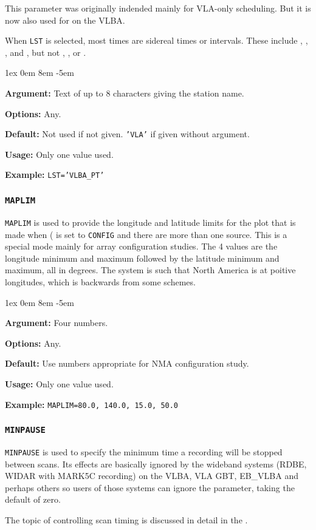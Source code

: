 \documentclass{report}
\newcommand{\rcwbox}[5]{
  \begin{list}{}{\parsep 1ex  \itemsep 0em
                 \leftmargin 8em  \itemindent -5em }
    \item {\bf Argument:} #1
    \item {\bf Options:}  #2
    \item {\bf Default:}  #3
    \item {\bf Usage:}    #4
    \item {\bf Example:}  #5
  \end{list}
}
\begin{document}
This parameter was originally indended mainly for VLA-only scheduling.
But it is now also used for 
on the VLBA.

When {\tt LST} is selected, most times are sidereal times or
intervals.  These include ,
, , and
, but not , , or
.

\rcwbox
{Text of up to 8 characters giving the station name.}
{Any.}
{Not used if not given. {\tt 'VLA'} if given without argument.}
{Only one value used.}
{{\tt LST='VLBA\_PT'}}

\subsubsection{\label{MP:MAPLIM}{\tt MAPLIM}}

{\tt MAPLIM} is used to provide the longitude and latitude limits for
the plot that is made when ( is
set to {\tt CONFIG} and there are more than one source.  This is
a special mode mainly for array configuration studies.  The 4
values are the longitude minimum and maximum followed by the
latitude minimum and maximum, all in degrees.  The system is such
that North America is at poitive longitudes, which is backwards from
some schemes.

\rcwbox
{Four numbers.}
{Any.}
{Use numbers appropriate for NMA configuration study.}
{Only one value used.}
{{\tt MAPLIM=80.0, 140.0, 15.0, 50.0}}


\subsubsection{\label{MP:MINPAUSE}{\tt MINPAUSE}}

{\tt MINPAUSE} is used to specify the minimum time a recording will be
stopped between scans.  Its effects are basically ignored by the 
wideband systems (RDBE, WIDAR with MARK5C recording) on the VLBA, VLA
GBT, EB\_VLBA and perhaps others so users of those systems can ignore
the parameter, taking the default of zero.

The topic of controlling scan timing is discussed in detail in
the .
\end{document}
